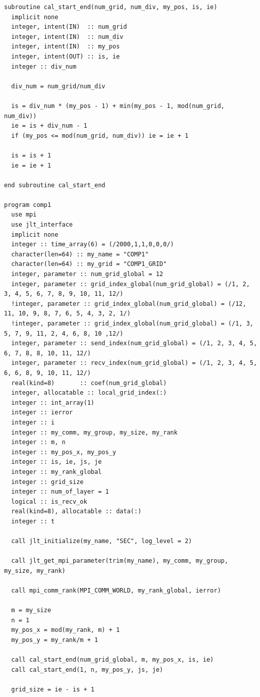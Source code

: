 \documentclass[11pt,a4paper]{report}
\begin{document}
\begin{lstlisting}[caption=Code of the toy model, label=list:code_toy]
subroutine cal_start_end(num_grid, num_div, my_pos, is, ie)
  implicit none
  integer, intent(IN)  :: num_grid
  integer, intent(IN)  :: num_div
  integer, intent(IN)  :: my_pos
  integer, intent(OUT) :: is, ie
  integer :: div_num

  div_num = num_grid/num_div

  is = div_num * (my_pos - 1) + min(my_pos - 1, mod(num_grid, num_div))
  ie = is + div_num - 1
  if (my_pos <= mod(num_grid, num_div)) ie = ie + 1

  is = is + 1
  ie = ie + 1

end subroutine cal_start_end

program comp1
  use mpi
  use jlt_interface
  implicit none
  integer :: time_array(6) = (/2000,1,1,0,0,0/)
  character(len=64) :: my_name = "COMP1"
  character(len=64) :: my_grid = "COMP1_GRID"
  integer, parameter :: num_grid_global = 12
  integer, parameter :: grid_index_global(num_grid_global) = (/1, 2, 3, 4, 5, 6, 7, 8, 9, 10, 11, 12/)
  !integer, parameter :: grid_index_global(num_grid_global) = (/12, 11, 10, 9, 8, 7, 6, 5, 4, 3, 2, 1/)
  !integer, parameter :: grid_index_global(num_grid_global) = (/1, 3, 5, 7, 9, 11, 2, 4, 6, 8, 10 ,12/)
  integer, parameter :: send_index(num_grid_global) = (/1, 2, 3, 4, 5, 6, 7, 8, 8, 10, 11, 12/)
  integer, parameter :: recv_index(num_grid_global) = (/1, 2, 3, 4, 5, 6, 6, 8, 9, 10, 11, 12/)
  real(kind=8)       :: coef(num_grid_global)
  integer, allocatable :: local_grid_index(:)
  integer :: int_array(1)
  integer :: ierror
  integer :: i
  integer :: my_comm, my_group, my_size, my_rank
  integer :: m, n
  integer :: my_pos_x, my_pos_y
  integer :: is, ie, js, je
  integer :: my_rank_global
  integer :: grid_size
  integer :: num_of_layer = 1
  logical :: is_recv_ok
  real(kind=8), allocatable :: data(:)
  integer :: t

  call jlt_initialize(my_name, "SEC", log_level = 2)

  call jlt_get_mpi_parameter(trim(my_name), my_comm, my_group, my_size, my_rank)

  call mpi_comm_rank(MPI_COMM_WORLD, my_rank_global, ierror)

  m = my_size
  n = 1
  my_pos_x = mod(my_rank, m) + 1
  my_pos_y = my_rank/m + 1

  call cal_start_end(num_grid_global, m, my_pos_x, is, ie)
  call cal_start_end(1, n, my_pos_y, js, je)

  grid_size = ie - is + 1


\end{lstlisting}
\end{document}
